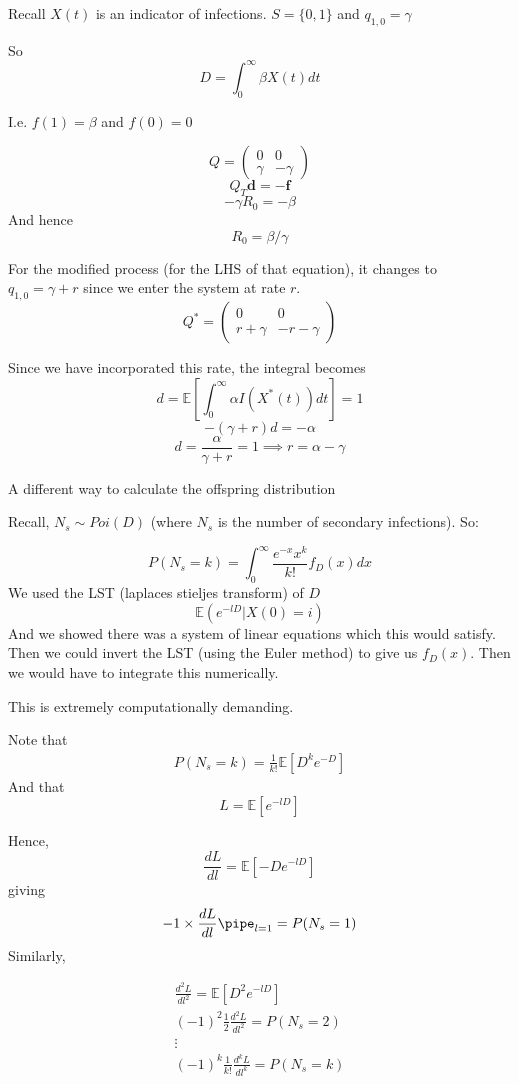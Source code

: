 \documentclass{X:/Documents/Coding/Latex/myassignment}
\begin{document}
Recall $X(t)$ is an indicator of infections. $S = \{0,1\}$ and $q_{1,0} = \gamma$

So 
\[D = \int_0^\infty \beta X(t) dt\]

I.e. $f(1) = \beta$ and $f(0) = 0$

\[Q = \begin{pmatrix}
    0&0\\ \gamma & -\gamma
\end{pmatrix}\]
\[Q_T \mathbf{d} = - \mathbf{f}\]
\[-\gamma R_0 = -\beta\]
And hence
\[R_0 = \beta/\gamma\]

For the modified process (for the LHS of that equation), it changes to $q_{1,0} = \gamma + r$ since we enter the system at rate $r$.
\[Q^* = \begin{pmatrix}
    0&0\\r + \gamma & - r- \gamma
\end{pmatrix}\]

Since we have incorporated this rate, the integral becomes 
\[d=\mathbb{E}\left[\int_0^\infty \alpha I(X^*(t)) dt\right]=1\]
\[-(\gamma + r)d = -\alpha\]
\[d = \frac{\alpha}{\gamma+r} = 1 \implies r = \alpha- \gamma\]


A different way to calculate the offspring distribution

Recall, $N_s \sim Poi(D)$ (where $N_s$ is the number of secondary infections). So:

\[P(N_s = k) = \int_0^\infty\frac{e^{-x}x^k}{k!} f_D(x) dx\]
We used the LST (laplaces stieljes transform) of $D$
\[\mathbb{E}(e^{-lD} | X(0) = i)\]
And we showed there was a system of linear equations which this would satisfy.
Then we could invert the LST (using the Euler method) to give us $f_D(x)$.
Then we would have to integrate this numerically.

This is extremely computationally demanding.



Note that 
\begin{align*}
  P(N_s =k) = \frac1{k!} \mathbb{E}\left[D^k e^{-D}\right]
\end{align*}
And that 
\[L = \mathbb{E}\left[e^{-lD}\right]\]

Hence,
\[\frac{dL}{dl} = \mathbb{E}\left[-De^{-lD}\right]\]
giving
\[-1 \times \frac{dL}{dl} \pipe_{l=1} = P(N_s=1)\]
Similarly,

\begin{align*}
    \frac{d^2L}{dl^2} = \mathbb{E}\left[D^2 e^{-lD}\right]\\
    (-1)^2\frac12 \frac{d^2 L }{dl^2} = P(N_s=2)\\
    \vdots\\
    (-1)^k \frac{1}{k!} \frac{d^kL}{dl^k} = P(N_s=k)    
\end{align*}
\end{document}
